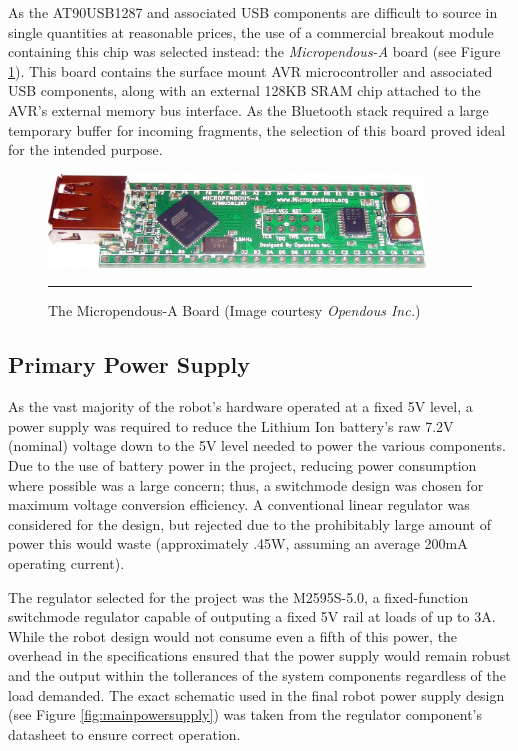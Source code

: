 As the AT90USB1287 and associated USB components are difficult to source in single quantities at reasonable prices, the use of a commercial breakout module containing this chip was selected instead: the \textit{Micropendous-A} board (see Figure \ref{fig:micropendous}). This board contains the surface mount AVR microcontroller and associated USB components, along with an external 128KB SRAM chip attached to the AVR's external memory bus interface. As the Bluetooth stack required a large temporary buffer for incoming fragments, the selection of this board proved ideal for the intended purpose.

\begin{figure}[h]
	\centering
		\includegraphics[width=100mm]{./Figures/MicropendousA.jpg}
	\rule{35em}{0.5pt}
	\caption[Micropendous-A Board]{The Micropendous-A Board (Image courtesy \textit{Opendous Inc.})}
	\label{fig:micropendous}
\end{figure}

\subsection{Primary Power Supply}

As the vast majority of the robot's hardware operated at a fixed 5V level, a power supply was required to reduce the Lithium Ion battery's raw 7.2V (nominal) voltage down to the 5V level needed to power the various components. Due to the use of battery power in the project, reducing power consumption where possible was a large concern; thus, a switchmode design was chosen for maximum voltage conversion efficiency. A conventional linear regulator was considered for the design, but rejected due to the prohibitably large amount of power this would waste (approximately .45W, assuming an average 200mA operating current).

The regulator selected for the project was the M2595S-5.0, a fixed-function switchmode regulator capable of outputing a fixed 5V rail at loads of up to 3A. While the robot design would not consume even a fifth of this power, the overhead in the specifications ensured that the power supply would remain robust and the output within the tollerances of the system components regardless of the load demanded. The exact schematic used in the final robot power supply design (see Figure \ref{fig:mainpowersupply}) was taken from the regulator component's datasheet to ensure correct operation.

